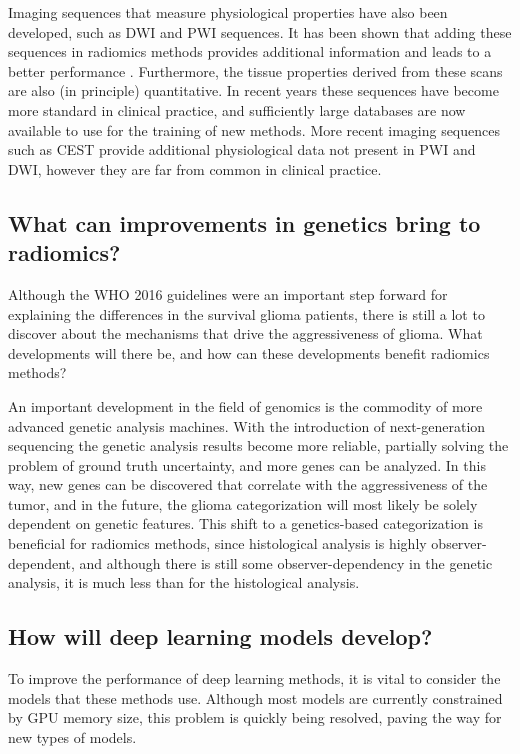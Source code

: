 Imaging sequences that measure physiological properties have also been developed, such as \gls{DWI} and \gls{PWI} sequences.
It has been shown that adding these sequences in radiomics methods provides additional information and leads to a better performance \autocite{park2020radiomicspwi,kim2020diffusion}.
Furthermore, the tissue properties derived from these scans are also (in principle) quantitative.
In recent years these sequences have become more standard in clinical practice, and sufficiently large databases are now available to use for the training of new methods.
More recent imaging sequences such as \gls{CEST} provide additional physiological data not present in \gls{PWI} and \gls{DWI}, however they are far from common in clinical practice.



\subsection{What can improvements in genetics bring to radiomics?}\label{sec:discussion_new_genetics}
Although the \gls{WHO} 2016 guidelines were an important step forward for explaining the differences in the survival glioma patients, there is still a lot to discover about the mechanisms that drive the aggressiveness of glioma.
What developments will there be, and how can these developments benefit radiomics methods?

An important development in the field of genomics is the commodity of more advanced genetic analysis machines.
With the introduction of next-generation sequencing the genetic analysis results become more reliable, partially solving the problem of ground truth uncertainty, and more genes can be analyzed.
In this way, new genes can be discovered that correlate with the aggressiveness of the \gls{tumor}, and in the future, the glioma categorization will most likely be solely dependent on genetic features.
This shift to a genetics-based categorization is beneficial for radiomics methods, since histological analysis is highly observer-dependent, and although there is still some observer-dependency in the genetic analysis, it is much less than for the histological analysis.


\subsection{How will deep learning models develop?}

To improve the performance of deep learning methods, it is vital to consider the models that these methods use.
Although most models are currently constrained by GPU memory size, this problem is quickly being resolved, paving the way for new types of models.


